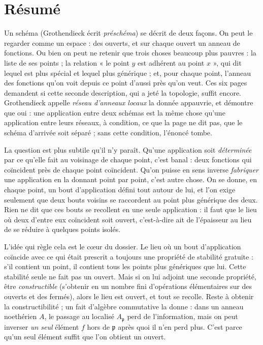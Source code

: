 \documentclass[11pt,a4paper]{article}
\begin{document}
\section*{Résumé}

\begin{resume}
Un schéma (Grothendieck écrit \emph{préschéma}) se décrit de deux
façons. On peut le regarder comme un espace : des ouverts, et sur chaque
ouvert un anneau de fonctions. Ou bien on peut ne retenir que trois choses
beaucoup plus pauvres : la liste de ses points ; la relation « le point $y$
est adhérent au point $x$ », qui dit lequel est plus spécial et lequel plus
générique ; et, pour chaque point, l'anneau des fonctions qu'on voit depuis ce
point d'aussi près qu'on veut. Ces six pages demandent si cette seconde
description, qui a jeté la topologie, suffit encore. Grothendieck appelle
\emph{réseau d'anneaux locaux} la donnée appauvrie, et démontre que oui : une
application entre deux schémas est la même chose qu'une application entre
leurs réseaux, à condition, ce que la page ne dit pas, que le schéma d'arrivée
soit séparé ; sans cette condition, l'énoncé tombe.

La question est plus subtile qu'il n'y paraît. Qu'une application soit \emph{déterminée} par ce qu'elle fait au
voisinage de chaque point, c'est banal : deux fonctions qui coïncident près de
chaque point coïncident. Qu'on puisse en sens inverse \emph{fabriquer} une
application en la donnant point par point, c'est autre chose. On se donne, en
chaque point, un bout d'application défini tout autour de lui, et l'on exige
seulement que deux bouts voisins se raccordent au point plus générique des
deux. Rien ne dit que ces bouts se recollent en une seule application : il
faut que le lieu où deux d'entre eux coïncident soit ouvert, c'est-à-dire ait
de l'épaisseur au lieu de se réduire à quelques points isolés.

L'idée qui règle cela est le cœur du dossier. Le lieu où
un bout d'application coïncide avec ce qui était prescrit a toujours une
propriété de stabilité gratuite : s'il contient un point, il contient tous les
points plus génériques que lui. Cette stabilité seule ne fait pas un ouvert.
Mais si on lui adjoint une seconde propriété, être \emph{constructible}
(s'obtenir en un nombre fini d'opérations élémentaires sur des
ouverts et des fermés), alors le lieu est ouvert, et tout se recolle. Reste
à obtenir la constructibilité ; un fait d'algèbre commutative la
donne : dans un anneau noethérien $A$, le passage au localisé $A_{\mathfrak
p}$ perd de l'information, mais on peut inverser \emph{un seul} élément
$f$ hors de $\mathfrak p$ après quoi il n'en perd plus. C'est parce qu'un
seul élément suffit que l'on obtient un ouvert.


\end{resume}
\end{document}
